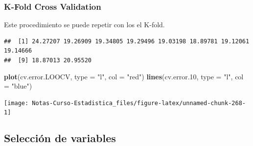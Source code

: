 \documentclass[
  12pt,
]{book}
\newenvironment{Shaded}{\begin{snugshade}}{\end{snugshade}}
\newcommand{\ControlFlowTok}[1]{\textcolor[rgb]{0.13,0.29,0.53}{\textbf{#1}}}
\newcommand{\DataTypeTok}[1]{\textcolor[rgb]{0.13,0.29,0.53}{#1}}
\newcommand{\DecValTok}[1]{\textcolor[rgb]{0.00,0.00,0.81}{#1}}
\newcommand{\FloatTok}[1]{\textcolor[rgb]{0.00,0.00,0.81}{#1}}
\newcommand{\KeywordTok}[1]{\textcolor[rgb]{0.13,0.29,0.53}{\textbf{#1}}}
\newcommand{\NormalTok}[1]{#1}
\newcommand{\OperatorTok}[1]{\textcolor[rgb]{0.81,0.36,0.00}{\textbf{#1}}}
\newcommand{\StringTok}[1]{\textcolor[rgb]{0.31,0.60,0.02}{#1}}
\theoremstyle{definition}
\theoremstyle{definition}
\theoremstyle{definition}
\theoremstyle{remark}
\begin{document}
\hypertarget{k-fold-cross-validation}{%
\subsubsection{K-Fold Cross Validation}\label{k-fold-cross-validation}}

Este procedimiento se puede repetir con los el K-fold.

\begin{Shaded}
\end{Shaded}

\begin{verbatim}
##  [1] 24.27207 19.26909 19.34805 19.29496 19.03198 18.89781 19.12061 19.14666
##  [9] 18.87013 20.95520
\end{verbatim}

\begin{Shaded}
\begin{Highlighting}[]
\KeywordTok{plot}\NormalTok{(cv.error.LOOCV, }\DataTypeTok{type =} \StringTok{"l"}\NormalTok{, }\DataTypeTok{col =} \StringTok{"red"}\NormalTok{)}
\KeywordTok{lines}\NormalTok{(cv.error}\FloatTok{.10}\NormalTok{, }\DataTypeTok{type =} \StringTok{"l"}\NormalTok{, }\DataTypeTok{col =} \StringTok{"blue"}\NormalTok{)}
\end{Highlighting}
\end{Shaded}

\begin{center}\texttt{[image: Notas-Curso-Estadistica\_files/figure-latex/unnamed-chunk-268-1]} \end{center}

\hypertarget{selecciuxf3n-de-variables}{%
\subsection{Selección de variables}\label{selecciuxf3n-de-variables}}
\end{document}
